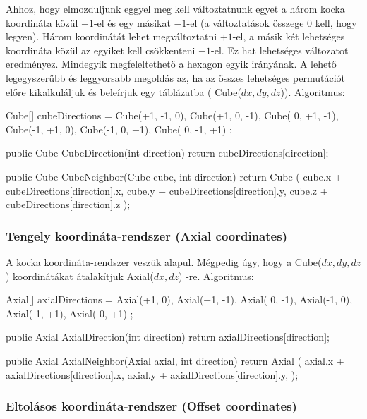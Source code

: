 \noindent Ahhoz, hogy elmozduljunk eggyel meg kell változtatnunk egyet a három kocka koordináta közül $+1$-el és egy másikat $-1$-el (a változtatások összege $0$ kell, hogy legyen). Három koordinátát lehet megváltoztatni $+1$-el, a másik két lehetséges koordináta közül az egyiket kell csökkenteni $-1$-el. Ez hat lehetséges változatot eredményez. Mindegyik megfeleltethető a hexagon egyik irányának. A lehető legegyszerűbb és leggyorsabb megoldás az, ha az összes lehetséges permutációt előre kikalkuláljuk és beleírjuk egy táblázatba ( Cube($dx, dy, dz$)).
\newline
\newline Algoritmus: 
\begin{cpp}
Cube[] cubeDirections = 
{ 
   Cube(+1, -1,  0), Cube(+1,  0, -1), Cube( 0, +1, -1),
   Cube(-1, +1,  0), Cube(-1,  0, +1), Cube( 0, -1, +1) 
};

public Cube CubeDirection(int direction)
{
   return cubeDirections[direction];
}

public Cube CubeNeighbor(Cube cube, int direction)
{
   return Cube
   (
      cube.x + cubeDirections[direction].x, 
      cube.y + cubeDirections[direction].y, 
      cube.z + cubeDirections[direction].z
   );
}
\end{cpp}

\subsubsection{Tengely koordináta-rendszer (Axial coordinates)}

\noindent A kocka koordináta-rendszer veszük alapul. Mégpedig úgy, hogy a Cube($ dx, dy, dz$) koordinátákat átalakítjuk Axial($ dx, dz$) -re.
\newline
\newline Algoritmus:
\begin{cpp}
Axial[] axialDirections = 
{ 
   Axial(+1,  0), Axial(+1, -1), Axial( 0, -1),
   Axial(-1,  0), Axial(-1, +1), Axial( 0, +1)
};

public Axial AxialDirection(int direction)
{
   return axialDirections[direction];
}

public Axial AxialNeighbor(Axial axial, int direction)
{
   return Axial
   (
      axial.x + axialDirections[direction].x, 
      axial.y + axialDirections[direction].y, 
   );
}
\end{cpp}

\subsubsection{Eltolásos koordináta-rendszer (Offset coordinates)}

